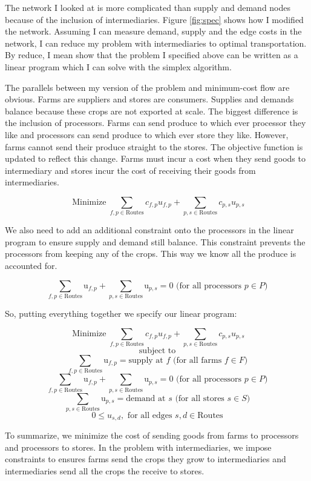 \documentclass{report}
\begin{document}

The network I looked at is more complicated than supply and demand nodes because of the inclusion of intermediaries. Figure \ref{fig:spec} shows how I modified the network. Assuming I can measure demand, supply and the edge costs in the network, I can reduce my problem with intermediaries to optimal transportation. By reduce, I mean show that the problem I specified above can be written as a linear program which I can solve with the simplex algorithm. 

The parallels between my version of the problem and minimum-cost flow are obvious. Farms are suppliers and stores are consumers. Supplies and demands balance because these crops are not exported at scale. The biggest difference is the inclusion of processors. Farms can send produce to which ever processor they like and processors can send produce to which ever store they like. However, farms cannot send their produce straight to the stores. The objective function is updated to reflect this change. Farms must incur a cost when they send goods to intermediary and stores incur the cost of receiving their goods from intermediaries.

$$\operatorname{Minimize} \sum_{f,p \in \text{Routes}} c_{f,p} u_{f,p} + \sum_{p,s \in \text{Routes}} c_{p,s} u_{p,s}$$

We also need to add an additional constraint onto the processors in the linear program to ensure supply and demand still balance. This constraint prevents the processors from keeping any of the crops. This way we know all the produce is accounted for.

$$\sum_{f,p \in \text{Routes}} \text{u}_{f,p} + \sum_{p,s \in \text{Routes}} \text{u}_{p,s} = 0 \text{ (for all processors } p \in P)$$

So, putting everything together we specify our linear program:

$$\operatorname{Minimize} \sum_{f,p \in \text{Routes}} c_{f,p} u_{f,p} + \sum_{p,s \in \text{Routes}} c_{p,s} u_{p,s}$$
$$\text{subject to}$$
$$\sum_{f,p \in \text{Routes}} \text{u}_{f,p}= \text{supply at } f \text{ (for all farms } f \in F)$$
$$\sum_{f,p \in \text{Routes}} \text{u}_{f,p} + \sum_{p,s \in \text{Routes}} \text{u}_{p,s} = 0 \text{ (for all processors } p \in P)$$
$$\sum_{p,s \in \text{Routes}} \text{u}_{p,s}= \text{demand at } s \text{ (for all stores } s \in S)$$
$$0 \leq u_{s,d}, \text{ for all edges } s,d \in \text{Routes}$$

To summarize, we minimize the cost of sending goods from farms to processors and processors to stores. In the problem with intermediaries, we impose constraints to ensures farms send the crops they grow to intermediaries and intermediaries send all the crops the receive to stores.
\end{document}
